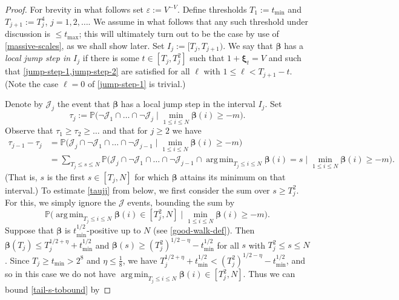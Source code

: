 \documentclass[11pt,reqno]{amsart}
\DeclareMathOperator*{\argmin}{arg\,min}
\numberwithin{equation}{section}
\theoremstyle{definition}
\theoremstyle{remark}
\newcommand{\mb}{\mathbb}
\newcommand{\eps}{\varepsilon}
\def\boldbeta{\boldsymbol\beta}
\def\boldxi{\boldsymbol\xi}
\renewcommand{\le}{\leqslant}
\renewcommand{\ge}{\geqslant}
\begin{document}
\begin{proof} For brevity in what follows set $\eps := V^{-V}$. 
Define thresholds $T_1 := t_{\min}$ and $T_{j+1} := T_j^{4}$, $j = 1,2,\dots$. We assume in what follows that any such threshold under discussion is $\le t_{\max}$; this will ultimately turn out to be the case by use of \cref{massive-scales}, as we shall show later. Set $I_j := [T_j, T_{j+1})$. We say that $\boldbeta$ has a \emph{local jump step in $I_j$} if there is some $t \in [T_j, T_{j}^2]$ such that $1 + \boldxi_t = V$ and such that \cref{jump-step-1,jump-step-2} are satisfied for all $\ell$ with $1 \le \ell < T_{j+1} - t$. (Note the case $\ell = 0$ of \cref{jump-step-1} is trivial.)

Denote by $\mathcal{J}_j$ the event that $\boldbeta$ has a local jump step in the interval $I_j$. Set
\[ \tau_j := \mb{P} \big( \neg \mathcal{J}_1 \cap \dots \cap \neg \mathcal{J}_{j} \mid \min_{1 \le i \le N} \boldbeta(i) \ge -m\big). \]
Observe that $\tau_1 \ge \tau_2 \ge \dots$ and that for $j \ge 2$ we have
\begin{align}\nonumber
\tau_{j-1} - \tau_j & = \mb{P} \big( \mathcal{J}_j \cap \neg \mathcal{J}_1 \cap \dots \cap  \neg\mathcal{J}_{j-1} \mid \min_{1 \le i \le N} \boldbeta(i) \ge -m\big) \\ & = \sum_{T_j \le s \le N} \mb{P} \big( \mathcal{J}_j \cap \neg \mathcal{J}_1 \cap \dots \cap \neg\mathcal{J}_{j-1} \cap \argmin_{T_j \le i \le N} \boldbeta(i) = s \mid \min_{1 \le i \le N} \boldbeta(i) \ge -m\big).\label{taujj}
\end{align}
(That is, $s$ is the first $s \in [T_j, N]$ for which $\boldbeta$ attains its minimum on that interval.) To estimate \cref{taujj} from below, we first consider the sum over $s \ge T_j^2$. For this, we simply ignore the $\mathcal{J}$ events, bounding the sum by
\begin{equation}\label{tail-s-tobound}  \mb{P} \big(\argmin_{T_j \le i \le N} \boldbeta(i) \in [T_j^2, N] \mid \min_{1 \le i \le N} \boldbeta(i) \ge -m\big) . \end{equation}
Suppose that $\boldbeta$ is $t_{\min}^{1/2}$-positive up to $N$ (see \cref{good-walk-def}). Then $\boldbeta(T_j) \le T_j^{1/2 + \eta} + t_{\min}^{1/2}$ and $\boldbeta(s) \ge (T_j^2)^{1/2 - \eta} - t_{\min}^{1/2}$ for all $s$ with $T_{j}^2 \le s \le N$. Since $T_j \ge t_{\min} > 2^8$ and $\eta \le \frac{1}{8}$, we have $T_j^{1/2 + \eta} + t_{\min}^{1/2} < (T_j^2)^{1/2 - \eta} - t_{\min}^{1/2}$, and so in this case we do not have $\argmin_{T_j \le i \le N} \boldbeta(i) \in [T_{j}^2, N]$. Thus we can bound \cref{tail-s-tobound} by

\end{proof}
\end{document}
